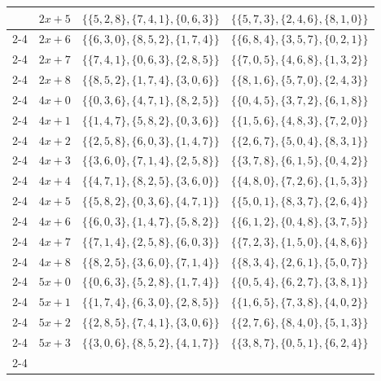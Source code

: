 \documentclass[preprint,11pt]{elsarticle}
\begin{document}
\begin{center}
\begin{longtable}{|c|c|c|c|}
           & $2x+5$ & $\{\{5,2,8\}, \{7,4,1\}, \{0,6,3\}\}$ & $\{\{5,7,3\}, \{2,4,6\}, \{8,1,0\}\}$ \\ \cline{2-4}
            & $2x+6$ & $\{\{6,3,0\}, \{8,5,2\}, \{1,7,4\}\}$ & $\{\{6,8,4\}, \{3,5,7\}, \{0,2,1\}\}$ \\ \cline{2-4}
             & $2x+7$ & $\{\{7,4,1\}, \{0,6,3\}, \{2,8,5\}\}$ & $\{\{7,0,5\}, \{4,6,8\}, \{1,3,2\}\}$ \\ \cline{2-4}
             & $2x+8$ & $\{\{8,5,2\}, \{1,7,4\}, \{3,0,6\}\}$ & $\{\{8,1,6\}, \{5,7,0\}, \{2,4,3\}\}$ \\ \cline{2-4}
        \hline \hline
         \multirow{9}{*}{4} 
        & $4x+0$ & $\{\{0,3,6\}, \{4,7,1\}, \{8,2,5\}\}$ & $\{\{0,4,5\}, \{3,7,2\}, \{6,1,8\}\}$ \\ \cline{2-4}
        & $4x+1$ & $\{\{1,4,7\}, \{5,8,2\}, \{0,3,6\}\}$ & $\{\{1,5,6\}, \{4,8,3\}, \{7,2,0\}\}$ \\ \cline{2-4}
        & $4x+2$ & $\{\{2,5,8\}, \{6,0,3\}, \{1,4,7\}\}$ & $\{\{2,6,7\}, \{5,0,4\}, \{8,3,1\}\}$ \\ \cline{2-4}
        & $4x+3$ & $\{\{3,6,0\}, \{7,1,4\}, \{2,5,8\}\}$ & $\{\{3,7,8\}, \{6,1,5\}, \{0,4,2\}\}$ \\ \cline{2-4}
        & $4x+4$ & $\{\{4,7,1\}, \{8,2,5\}, \{3,6,0\}\}$ & $\{\{4,8,0\}, \{7,2,6\}, \{1,5,3\}\}$ \\ \cline{2-4}
        & $4x+5$ & $\{\{5,8,2\}, \{0,3,6\}, \{4,7,1\}\}$ & $\{\{5,0,1\}, \{8,3,7\}, \{2,6,4\}\}$ \\ \cline{2-4}
         & $4x+6$ & $\{\{6,0,3\}, \{1,4,7\}, \{5,8,2\}\}$ & $\{\{6,1,2\}, \{0,4,8\}, \{3,7,5\}\}$ \\ \cline{2-4}
        & $4x+7$ & $\{\{7,1,4\}, \{2,5,8\}, \{6,0,3\}\}$ & $\{\{7,2,3\}, \{1,5,0\}, \{4,8,6\}\}$ \\ \cline{2-4}
         & $4x+8$ & $\{\{8,2,5\}, \{3,6,0\}, \{7,1,4\}\}$ & $\{\{8,3,4\}, \{2,6,1\}, \{5,0,7\}\}$ \\ \cline{2-4}
        \hline \hline
         \multirow{9}{*}{5} 
        & $5x+0$ & $\{\{0,6,3\}, \{5,2,8\}, \{1,7,4\}\}$ & $\{\{0,5,4\}, \{6,2,7\}, \{3,8,1\}\}$ \\ \cline{2-4}
        & $5x+1$  & $\{\{1,7,4\}, \{6,3,0\}, \{2,8,5\}\}$ & $\{\{1,6,5\}, \{7,3,8\}, \{4,0,2\}\}$ \\ \cline{2-4}
        & $5x+2$  & $\{\{2,8,5\}, \{7,4,1\}, \{3,0,6\}\}$ & $\{\{2,7,6\}, \{8,4,0\}, \{5,1,3\}\}$ \\ \cline{2-4}
        & $5x+3$  & $\{\{3,0,6\}, \{8,5,2\}, \{4,1,7\}\}$ & $\{\{3,8,7\}, \{0,5,1\}, \{6,2,4\}\}$ \\ \cline{2-4}

\end{longtable}
\end{center}
\end{document}
